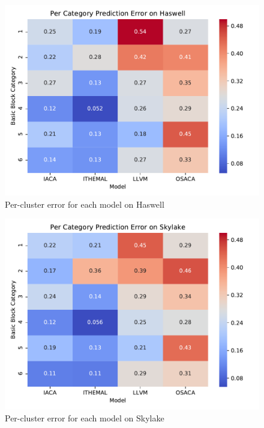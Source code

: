 \begin{figure}
\includegraphics[width=\columnwidth]{figures/hsw-cluster-err.pdf}
\caption{Per-cluster error for each model on Haswell}
\label{fig:hsw-cluster-err}
\end{figure}

\begin{figure}
\includegraphics[width=\columnwidth]{figures/skl-cluster-err.pdf}
\caption{Per-cluster error for each model on Skylake}
\label{fig:skl-cluster-err}
\end{figure} 
